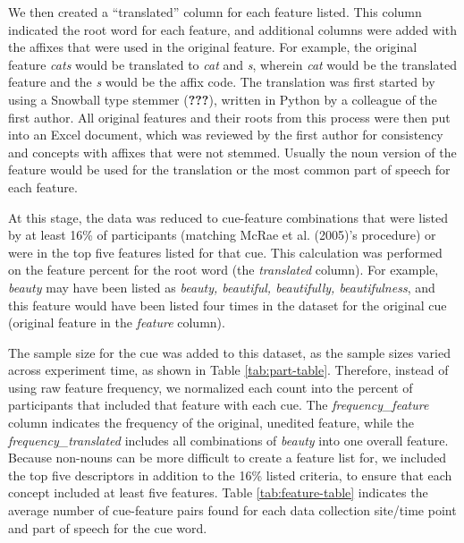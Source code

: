 \documentclass[english,,man]{apa6}
\theoremstyle{definition}
\theoremstyle{definition}
\theoremstyle{definition}
\theoremstyle{remark}
\begin{document}
We then created a \enquote{translated} column for each feature listed.
This column indicated the root word for each feature, and additional
columns were added with the affixes that were used in the original
feature. For example, the original feature \emph{cats} would be
translated to \emph{cat} and \emph{s}, wherein \emph{cat} would be the
translated feature and the \emph{s} would be the affix code. The
translation was first started by using a Snowball type stemmer
({\textbf{???}}), written in Python by a colleague of the first author.
All original features and their roots from this process were then put
into an Excel document, which was reviewed by the first author for
consistency and concepts with affixes that were not stemmed. Usually the
noun version of the feature would be used for the translation or the
most common part of speech for each feature.

At this stage, the data was reduced to cue-feature combinations that
were listed by at least 16\% of participants (matching McRae et al.
(2005)'s procedure) or were in the top five features listed for that
cue. This calculation was performed on the feature percent for the root
word (the \emph{translated} column). For example, \emph{beauty} may have
been listed as \emph{beauty, beautiful, beautifully, beautifulness}, and
this feature would have been listed four times in the dataset for the
original cue (original feature in the \emph{feature} column).

The sample size for the cue was added to this dataset, as the sample
sizes varied across experiment time, as shown in Table
\ref{tab:part-table}. Therefore, instead of using raw feature frequency,
we normalized each count into the percent of participants that included
that feature with each cue. The \emph{frequency\_feature} column
indicates the frequency of the original, unedited feature, while the
\emph{frequency\_translated} includes all combinations of \emph{beauty}
into one overall feature. Because non-nouns can be more difficult to
create a feature list for, we included the top five descriptors in
addition to the 16\% listed criteria, to ensure that each concept
included at least five features. Table \ref{tab:feature-table} indicates
the average number of cue-feature pairs found for each data collection
site/time point and part of speech for the cue word.
\end{document}
